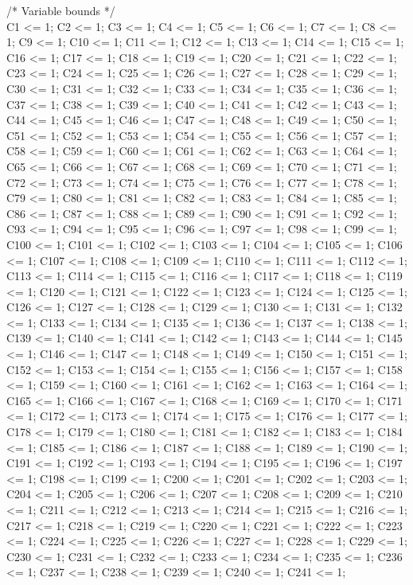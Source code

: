 /* Variable bounds */ \\
C1 <= 1;
C2 <= 1;
C3 <= 1;
C4 <= 1;
C5 <= 1;
C6 <= 1;
C7 <= 1;
C8 <= 1;
C9 <= 1;
C10 <= 1;
C11 <= 1;
C12 <= 1;
C13 <= 1;
C14 <= 1;
C15 <= 1;
C16 <= 1;
C17 <= 1;
C18 <= 1;
C19 <= 1;
C20 <= 1;
C21 <= 1;
C22 <= 1;
C23 <= 1;
C24 <= 1;
C25 <= 1;
C26 <= 1;
C27 <= 1;
C28 <= 1;
C29 <= 1;
C30 <= 1;
C31 <= 1;
C32 <= 1;
C33 <= 1;
C34 <= 1;
C35 <= 1;
C36 <= 1;
C37 <= 1;
C38 <= 1;
C39 <= 1;
C40 <= 1;
C41 <= 1;
C42 <= 1;
C43 <= 1;
C44 <= 1;
C45 <= 1;
C46 <= 1;
C47 <= 1;
C48 <= 1;
C49 <= 1;
C50 <= 1;
C51 <= 1;
C52 <= 1;
C53 <= 1;
C54 <= 1;
C55 <= 1;
C56 <= 1;
C57 <= 1;
C58 <= 1;
C59 <= 1;
C60 <= 1;
C61 <= 1;
C62 <= 1;
C63 <= 1;
C64 <= 1;
C65 <= 1;
C66 <= 1;
C67 <= 1;
C68 <= 1;
C69 <= 1;
C70 <= 1;
C71 <= 1;
C72 <= 1;
C73 <= 1;
C74 <= 1;
C75 <= 1;
C76 <= 1;
C77 <= 1;
C78 <= 1;
C79 <= 1;
C80 <= 1;
C81 <= 1;
C82 <= 1;
C83 <= 1;
C84 <= 1;
C85 <= 1;
C86 <= 1;
C87 <= 1;
C88 <= 1;
C89 <= 1;
C90 <= 1;
C91 <= 1;
C92 <= 1;
C93 <= 1;
C94 <= 1;
C95 <= 1;
C96 <= 1;
C97 <= 1;
C98 <= 1;
C99 <= 1;
C100 <= 1;
C101 <= 1;
C102 <= 1;
C103 <= 1;
C104 <= 1;
C105 <= 1;
C106 <= 1;
C107 <= 1;
C108 <= 1;
C109 <= 1;
C110 <= 1;
C111 <= 1;
C112 <= 1;
C113 <= 1;
C114 <= 1;
C115 <= 1;
C116 <= 1;
C117 <= 1;
C118 <= 1;
C119 <= 1;
C120 <= 1;
C121 <= 1;
C122 <= 1;
C123 <= 1;
C124 <= 1;
C125 <= 1;
C126 <= 1;
C127 <= 1;
C128 <= 1;
C129 <= 1;
C130 <= 1;
C131 <= 1;
C132 <= 1;
C133 <= 1;
C134 <= 1;
C135 <= 1;
C136 <= 1;
C137 <= 1;
C138 <= 1;
C139 <= 1;
C140 <= 1;
C141 <= 1;
C142 <= 1;
C143 <= 1;
C144 <= 1;
C145 <= 1;
C146 <= 1;
C147 <= 1;
C148 <= 1;
C149 <= 1;
C150 <= 1;
C151 <= 1;
C152 <= 1;
C153 <= 1;
C154 <= 1;
C155 <= 1;
C156 <= 1;
C157 <= 1;
C158 <= 1;
C159 <= 1;
C160 <= 1;
C161 <= 1;
C162 <= 1;
C163 <= 1;
C164 <= 1;
C165 <= 1;
C166 <= 1;
C167 <= 1;
C168 <= 1;
C169 <= 1;
C170 <= 1;
C171 <= 1;
C172 <= 1;
C173 <= 1;
C174 <= 1;
C175 <= 1;
C176 <= 1;
C177 <= 1;
C178 <= 1;
C179 <= 1;
C180 <= 1;
C181 <= 1;
C182 <= 1;
C183 <= 1;
C184 <= 1;
C185 <= 1;
C186 <= 1;
C187 <= 1;
C188 <= 1;
C189 <= 1;
C190 <= 1;
C191 <= 1;
C192 <= 1;
C193 <= 1;
C194 <= 1;
C195 <= 1;
C196 <= 1;
C197 <= 1;
C198 <= 1;
C199 <= 1;
C200 <= 1;
C201 <= 1;
C202 <= 1;
C203 <= 1;
C204 <= 1;
C205 <= 1;
C206 <= 1;
C207 <= 1;
C208 <= 1;
C209 <= 1;
C210 <= 1;
C211 <= 1;
C212 <= 1;
C213 <= 1;
C214 <= 1;
C215 <= 1;
C216 <= 1;
C217 <= 1;
C218 <= 1;
C219 <= 1;
C220 <= 1;
C221 <= 1;
C222 <= 1;
C223 <= 1;
C224 <= 1;
C225 <= 1;
C226 <= 1;
C227 <= 1;
C228 <= 1;
C229 <= 1;
C230 <= 1;
C231 <= 1;
C232 <= 1;
C233 <= 1;
C234 <= 1;
C235 <= 1;
C236 <= 1;
C237 <= 1;
C238 <= 1;
C239 <= 1;
C240 <= 1;
C241 <= 1;
